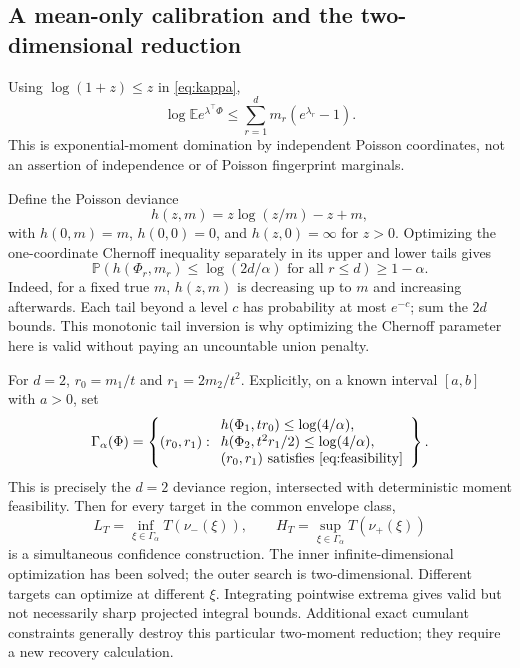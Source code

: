 \documentclass[11pt]{article}
\numberwithin{equation}{section}
\theoremstyle{definition}
\theoremstyle{remark}
\newcommand{\E}{\mathbb E}
\newcommand{\Pp}{\mathbb P}
\begin{document}
\subsection{A mean-only calibration and the two-dimensional reduction}
Using $\log(1+z)\le z$ in \eqref{eq:kappa},
\begin{equation}\label{eq:poissondom}
 \log\E e^{\lambda^\top\Phi}\le\sum_{r=1}^d m_r(e^{\lambda_r}-1).
\end{equation}
This is exponential-moment domination by independent Poisson coordinates, not an assertion of independence or of Poisson fingerprint marginals.

Define the Poisson deviance
\[
 h(z,m)=z\log(z/m)-z+m,
\]
with $h(0,m)=m$, $h(0,0)=0$, and $h(z,0)=\infty$ for $z>0$. Optimizing the one-coordinate Chernoff inequality separately in its upper and lower tails gives
\begin{equation}\label{eq:deviance}
 \Pp\left(h(\Phi_r,m_r)\le\log(2d/\alpha)
                         \text{ for all }r\le d\right)\ge1-\alpha.
\end{equation}
Indeed, for a fixed true $m$, $h(z,m)$ is decreasing up to $m$ and increasing afterwards. Each tail beyond a level $c$ has probability at most $e^{-c}$; sum the $2d$ bounds. This monotonic tail inversion is why optimizing the Chernoff parameter here is valid without paying an uncountable union penalty.

For $d=2$, $r_0=m_1/t$ and $r_1=2m_2/t^2$. Explicitly, on a known interval $[a,b]$ with $a>0$, set
\begin{equation}\label{eq:gammaexplicit}
 \Gamma_\alpha(\Phi)=\left\{(r_0,r_1):
 \begin{array}{l}
 h(\Phi_1,tr_0)\le\log(4/\alpha),\\
 h(\Phi_2,t^2r_1/2)\le\log(4/\alpha),\\
 (r_0,r_1)\text{ satisfies \eqref{eq:feasibility}}
 \end{array}\right\}.
\end{equation}
This is precisely the $d=2$ deviance region, intersected with deterministic moment feasibility. Then for every target in the common envelope class,
\begin{equation}\label{eq:twodimconf}
 L_T=\inf_{\xi\in\Gamma_\alpha}T(\nu_-(\xi)),\qquad
 H_T=\sup_{\xi\in\Gamma_\alpha}T(\nu_+(\xi))
\end{equation}
is a simultaneous confidence construction. The inner infinite-dimensional optimization has been solved; the outer search is two-dimensional. Different targets can optimize at different $\xi$. Integrating pointwise extrema gives valid but not necessarily sharp projected integral bounds. Additional exact cumulant constraints generally destroy this particular two-moment reduction; they require a new recovery calculation.
\end{document}
